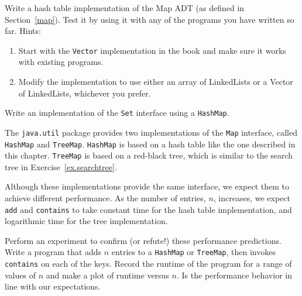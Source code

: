 \begin{exercise}
Write a hash table implementation of the Map ADT (as defined in
Section~\ref{map}).  Test it by using it with any of the programs
you have written so far.  Hints:

\begin{enumerate}

\item Start with the {\tt Vector} implementation in the book
and make sure it works with existing programs.

\item Modify the implementation to use either an array of
LinkedLists or a Vector of LinkedLists, whichever you prefer.

\end{enumerate}
\end{exercise}


\begin{exercise}
Write an implementation of the {\tt Set} interface using a
{\tt HashMap}.
\end {exercise}


\begin{exercise}

The {\tt java.util} package provides two implementations of the
{\tt Map} interface, called {\tt HashMap} and {\tt TreeMap}.
{\tt HashMap} is based on a hash table like the one described
in this chapter.  {\tt TreeMap} is based on a red-black tree, which
is similar to the search tree in Exercise~\ref{ex.searchtree}.

Although these implementations provide the same interface, we
expect them to achieve different performance.  As the number of
entries, $n$, increases, we expect {\tt add} and {\tt contains}
to take constant time for the hash table implementation, and
logarithmic time for the tree implementation.

Perform an experiment to confirm (or refute!) these performance
predictions.  Write a program that adds $n$ entries to a 
{\tt HashMap} or {\tt TreeMap}, then invokes {\tt contains} on
each of the keys.  Record the runtime of the program for a range
of values of $n$ and make a plot of runtime versus $n$.  Is
the performance behavior in line with our expectations.
\end {exercise}





